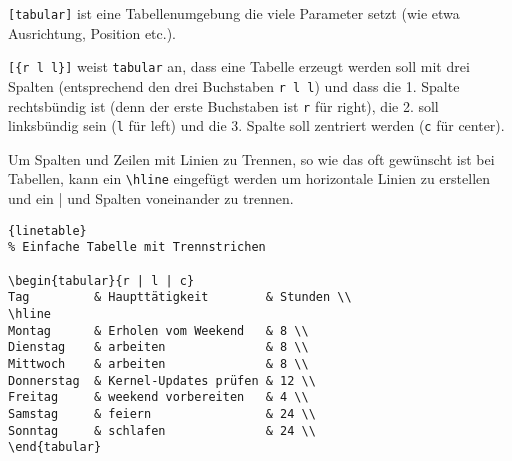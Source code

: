 \begin{description}
    \item \lstinline|[tabular]| ist eine Tabellenumgebung
die viele Parameter setzt (wie etwa Ausrichtung, Position
etc.).
    \item \lstinline|[{r l l}]| weist \lstinline|tabular|
an, dass eine Tabelle erzeugt werden soll mit drei Spalten
(entsprechend den drei Buchstaben \lstinline|r l l|) und
dass die 1. Spalte rechtsbündig ist (denn der erste
Buchstaben ist \lstinline|r| für right), die 2. soll
linksbündig sein (\lstinline|l| für left) und die 3. Spalte
soll zentriert werden (\lstinline|c| für center).
\end{description}

\noindent
Um Spalten und Zeilen mit Linien zu Trennen, so wie das oft
gewünscht ist bei Tabellen, kann ein \lstinline|\hline|
eingefügt werden um horizontale Linien zu erstellen und ein
\lstinline||| und Spalten voneinander zu trennen.

\begin{center}
\begin{lstlisting}[caption=Tabelle mit
Trennstrichen]{linetable}
% Einfache Tabelle mit Trennstrichen

\begin{tabular}{r | l | c}
Tag         & Haupttätigkeit        & Stunden \\
\hline
Montag      & Erholen vom Weekend   & 8 \\
Dienstag    & arbeiten              & 8 \\
Mittwoch    & arbeiten              & 8 \\
Donnerstag  & Kernel-Updates prüfen & 12 \\
Freitag     & weekend vorbereiten   & 4 \\
Samstag     & feiern                & 24 \\
Sonntag     & schlafen              & 24 \\
\end{tabular}
\end{lstlisting}
\end{center}

\\\\

